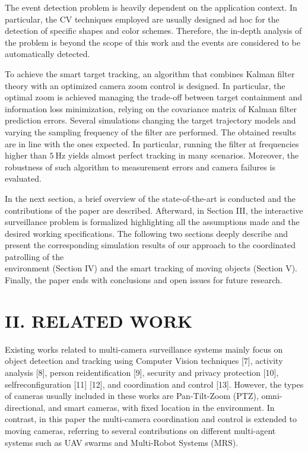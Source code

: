 \documentclass[conference]{IEEEtran}
\begin{document}
The event detection problem is heavily dependent on the application context. In particular, the CV techniques employed are usually designed ad hoc for the detection of specific shapes and color schemes. Therefore, the in-depth analysis of the problem is beyond the scope of this work and the events are considered to be automatically detected.

To achieve the smart target tracking, an algorithm that combines Kalman filter theory with an optimized camera zoom control is designed. In particular, the optimal zoom is achieved managing the trade-off between target containment and information loss minimization, relying on the covariance matrix of Kalman filter prediction errors. Several simulations changing the target trajectory models and varying the sampling frequency of the filter are performed. The obtained results are in line with the ones expected. In particular, running the filter at frequencies higher than $5 \mathrm{~Hz}$ yields almost perfect tracking in many scenarios. Moreover, the robustness of such algorithm to measurement errors and camera failures is evaluated.

In the next section, a brief overview of the state-of-the-art is conducted and the contributions of the paper are described. Afterward, in Section III, the interactive surveillance problem is formalized highlighting all the assumptions made and the desired working specifications. The following two sections deeply describe and present the corresponding simulation results of our approach to the coordinated patrolling of the\\
environment (Section IV) and the smart tracking of moving objects (Section V). Finally, the paper ends with conclusions and open issues for future research.

\section*{II. RELATED WORK}
Existing works related to multi-camera surveillance systems mainly focus on object detection and tracking using Computer Vision techniques [7], activity analysis [8], person reidentification [9], security and privacy protection [10], selfreconfiguration [11] [12], and coordination and control [13]. However, the types of cameras usually included in these works are Pan-Tilt-Zoom (PTZ), omni-directional, and smart cameras, with fixed location in the environment. In contrast, in this paper the multi-camera coordination and control is extended to moving cameras, referring to several contributions on different multi-agent systems such as UAV swarms and Multi-Robot Systems (MRS).
\end{document}
